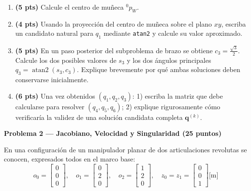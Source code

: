 \documentclass[11pt, a4paper]{article}
\begin{document}
\begin{enumerate}[label=\textbf{\alph*)}]
    \item \textbf{(5 pts)} Calcule el centro de muñeca ${}^0p_W$.
    \item \textbf{(4 pts)} Usando la proyección del centro de muñeca sobre el plano $xy$, escriba un candidato natural para $q_1$ mediante \texttt{atan2} y calcule su valor aproximado.
    \item \textbf{(5 pts)} En un paso posterior del subproblema de brazo se obtiene $c_3 = \frac{\sqrt{3}}{2}$. Calcule los dos posibles valores de $s_3$ y los dos ángulos principales $q_3 = \operatorname{atan2}(s_3, c_3)$. Explique brevemente por qué ambas soluciones deben conservarse inicialmente.
    \item \textbf{(6 pts)} Una vez obtenidos $(q_1, q_2, q_3)$: 1) escriba la matriz que debe calcularse para resolver $(q_4, q_5, q_6)$; 2) explique rigurosamente cómo verificaría la validez de una solución candidata completa $\mathbf{q}^{(k)}$.
\end{enumerate}

\noindent\textbf{\large Problema 2 — Jacobiano, Velocidad y Singularidad (25 puntos)}

En una configuración de un manipulador planar de dos articulaciones revolutas se conocen, expresados todos en el marco base:
\begin{equation*}
    o_0 = \begin{bmatrix} 0 \\ 0 \\ 0 \end{bmatrix}, \quad o_1 = \begin{bmatrix} 0 \\ 2 \\ 0 \end{bmatrix}, \quad o_2 = \begin{bmatrix} 1 \\ 2 \\ 0 \end{bmatrix}, \quad z_0 = z_1 = \begin{bmatrix} 0 \\ 0 \\ 1 \end{bmatrix} \text{[m]}
\end{equation*}
\end{document}
